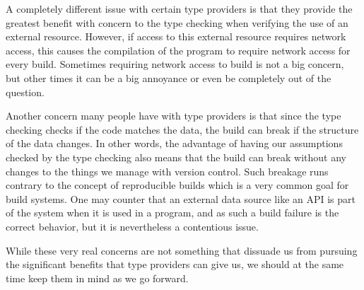 A completely different issue with certain type providers is that they provide the greatest benefit with concern to the type checking when verifying the use of an external resource. However, if access to this external resource requires network access, this causes the compilation of the program to require network access for every build. Sometimes requiring network access to build is not a big concern, but other times it can be a big annoyance or even be completely out of the question.

Another concern many people have with type providers is that since the type checking checks if the code matches the data, the build can break if the structure of the data changes. In other words, the advantage of having our assumptions checked by the type checking also means that the build can break without any changes to the things we manage with version control. Such breakage runs contrary to the concept of reproducible builds which is a very common goal for build systems. One may counter that an external data source like an API is part of the system when it is used in a program, and as such a build failure is the correct behavior, but it is nevertheless a contentious issue.

While these very real concerns are not something that dissuade us from pursuing the significant benefits that type providers can give us, we should at the same time keep them in mind as we go forward.
